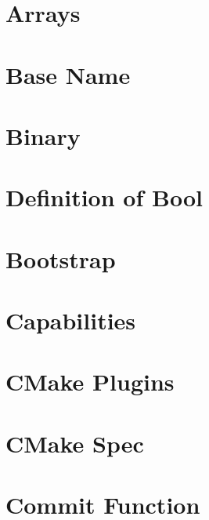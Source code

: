 \let\mypdfximage\pdfximage\def\pdfximage{\immediate\mypdfximage}\documentclass[twoside]{book}
\newcommand{\+}{\discretionary{\mbox{\scriptsize$\hookleftarrow$}}{}{}}
\begin{document}
\chapter{Arrays}
\label{doc_decisions_array_md}

\chapter{Base Name}
\label{doc_decisions_base_name_md}

\chapter{Binary}
\label{doc_decisions_binary_md}

\chapter{Definition of Bool}
\label{doc_decisions_boolean_md}

\chapter{Bootstrap}
\label{doc_decisions_bootstrap_md}

\chapter{Capabilities}
\label{doc_decisions_capabilities_md}

\chapter{CMake Plugins}
\label{doc_decisions_cmake_plugins_md}

\chapter{CMake Spec}
\label{doc_decisions_cmake_spec_md}

\chapter{Commit Function}
\label{doc_decisions_commit_function_md}

\end{document}
